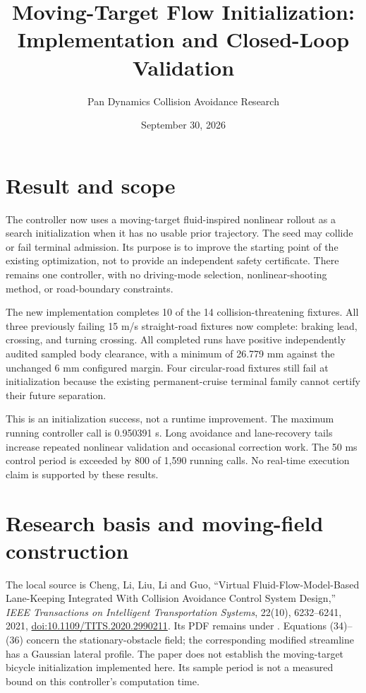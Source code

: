 \documentclass[11pt]{article}
\title{Moving-Target Flow Initialization: Implementation and Closed-Loop Validation}
\author{Pan Dynamics Collision Avoidance Research}
\date{September 30, 2026}
\begin{document}
\maketitle

\section{Result and scope}
The controller now uses a moving-target fluid-inspired nonlinear rollout as a
search initialization when it has no usable prior trajectory. The seed may
collide or fail terminal admission. Its purpose is to improve the starting
point of the existing optimization, not to provide an independent safety
certificate. There remains one controller, with no driving-mode selection,
nonlinear-shooting method, or road-boundary constraints.

The new implementation completes 10 of the 14 collision-threatening fixtures.
All three previously failing 15 m/s straight-road fixtures now complete:
braking lead, crossing, and turning crossing. All completed runs have positive
independently audited sampled body clearance, with a minimum of 26.779 mm
against the unchanged 6 mm configured margin. Four circular-road fixtures still
fail at initialization because the existing permanent-cruise terminal family
cannot certify their future separation.

This is an initialization success, not a runtime improvement. The maximum
running controller call is 0.950391 s. Long avoidance and lane-recovery tails
increase repeated nonlinear validation and occasional correction work. The
50 ms control period is exceeded by 800 of 1,590 running calls. No real-time
execution claim is supported by these results.

\section{Research basis and moving-field construction}
The local source is Cheng, Li, Liu, Li and Guo, ``Virtual Fluid-Flow-Model-Based
Lane-Keeping Integrated With Collision Avoidance Control System Design,''
\emph{IEEE Transactions on Intelligent Transportation Systems}, 22(10),
6232--6241, 2021, \href{https://doi.org/10.1109/TITS.2020.2990211}{doi:10.1109/TITS.2020.2990211}.
Its PDF remains under . Equations (34)--(36) concern the
stationary-obstacle field; the corresponding modified streamline has a
Gaussian lateral profile. The paper does not establish the moving-target
bicycle initialization implemented here. Its sample period is not a measured
bound on this controller's computation time.
\end{document}
